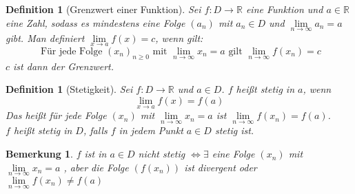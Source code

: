 \documentclass[a4paper,titlepage,oneside]{article}
\def\R{\ensuremath{\mathbb{R}} }
\renewcommand{\liminf}[2][n]{\ensuremath{\lim\limits_{#1 \rightarrow \infty}{#2}}}
\theoremstyle{thmstyle}
\newtheorem{defi}[satz]{Definition}
\newtheorem{bem}[satz]{Bemerkung}
\theoremstyle{subthmstyle}
\begin{document}
\begin{defi}[Grenzwert einer Funktion]
Sei $f : D \to \R$ eine Funktion und $a \in \R$ eine Zahl, sodass es mindestens eine Folge $(a_n)$ mit $a_n \in D$ und $\liminf{a_n} = a $ gibt.
Man definiert \(\lim\limits_{x \to a}{ f(x)} = c\), wenn gilt:
\[\text{ Für jede Folge } (x_n)_{n\ge0} \text{ mit } \liminf{x_n} = a \text{ gilt } \liminf{f(x_n)} = c\]
$c$ ist dann der Grenzwert.
\end{defi}

\begin{defi}[Stetigkeit]
Sei $f: D \to \R$ und $a \in D$. $f$ heißt stetig in $a$, wenn
\[\lim\limits_{x \to a}{f(x)} = f(a)\]
Das heißt für jede Folge $(x_n)$ mit $\liminf{x_n} = a$ ist $\liminf{f(x_n)} = f(a)$.\\
$f$ heißt stetig in $D$, falls $f$ in jedem Punkt $a \in D$ stetig ist.
\end{defi}

\begin{bem}
$f$ ist in $a \in D$ nicht stetig $\Leftrightarrow \exists$ eine Folge $(x_n)$ mit $\liminf{x_n} = a$ , aber die Folge $(f(x_n))$ ist divergent oder $\liminf{f(x_n)} \ne f(a)$
\end{bem}
\end{document}
